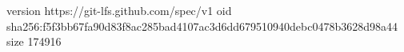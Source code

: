 version https://git-lfs.github.com/spec/v1
oid sha256:f5f3bb67fa90d83f8ac285bad4107ac3d6dd679510940debc0478b3628d98a44
size 174916
